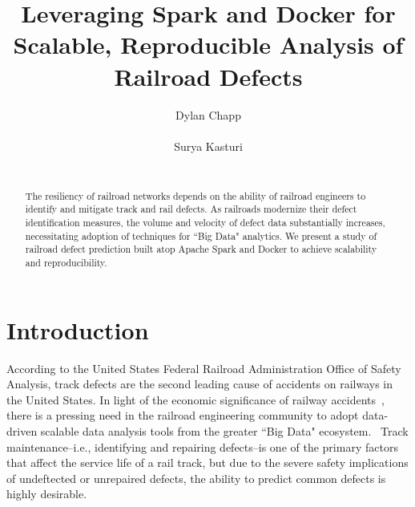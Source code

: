 \documentclass{sig-alternate-05-2015}
\begin{document}





%

\title{Leveraging Spark and Docker for Scalable, Reproducible Analysis of Railroad Defects}

\author{
\alignauthor
Dylan Chapp\\
       \\
\alignauthor
Surya Kasturi\\
       \\
}

\maketitle
\begin{abstract}
The resiliency of railroad networks depends on the ability of railroad 
engineers to identify and mitigate track and rail defects. As railroads
modernize their defect identification measures, the volume and velocity of 
defect data substantially increases, necessitating adoption of techniques
for ``Big Data" analytics. We present a study of railroad defect prediction 
built atop Apache Spark and Docker to achieve scalability and reproducibility.
\end{abstract}

\section{Introduction}
According to the United States Federal Railroad Administration Office of Safety Analysis, track defects are the second leading cause of accidents on railways in the United States.
In light of the economic significance of railway accidents~\cite{Schafer:08}, there is a pressing need in the railroad engineering community to adopt data-driven scalable data analysis tools from the greater ``Big Data" ecosystem.~\cite{Zarembski:14} 
Track maintenance--i.e., identifying and repairing defects--is one of the primary factors that affect the service life of a rail track, but due to the severe safety implications of undeftected or unrepaired defects, the ability to predict common defects is highly desirable. 
\end{document}
